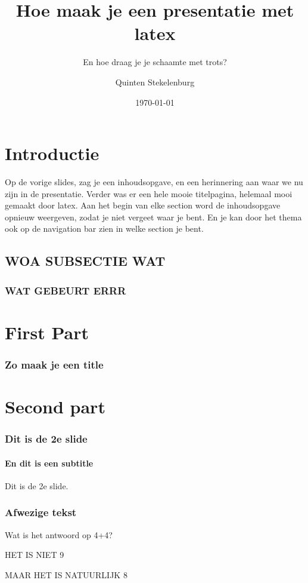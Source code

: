\documentclass{beamer}
\title[Something]{Hoe maak je een presentatie met latex}
\subtitle{En hoe draag je je schaamte met trots?}
\institute{Hogeschool Rotterdam}
\author{Quinten Stekelenburg}
\date{\today}
\begin{document}
\frame{\titlepage}


\frame
{
	\tableofcontents
}

\section[Introductie]{Introductie}


\frame
{
Op de vorige slides, zag je een inhoudsopgave, en een herinnering aan waar we nu zijn in de presentatie. Verder was er een hele mooie titelpagina, helemaal mooi gemaakt door latex. Aan het begin van elke section word de inhoudsopgave opnieuw weergeven, zodat je niet vergeet waar je bent. En je kan door het thema ook op de navigation bar zien in welke section je bent.
\transdissolve
}

\subsection[WOA SUBSECTIE WAT]{WOA SUBSECTIE WAT}

\frame
{
\blindtext
}

\subsubsection[WOA EEN SUBSUBSECTIE]{WAT GEBEURT ERRR}

\frame
{
\blindtext
}

\section[First Part]{First Part}

\frame
{
	\frametitle{Zo maak je een title}
	\blindtext
}

\section[Second part]{Second part}

\frame
{
\frametitle{Dit is de 2e slide}
\framesubtitle{En dit is een subtitle}
Dit is de 2e slide.
}

\frame
{
\frametitle{Afwezige tekst}
Wat is het antwoord op 4+4?
\pause

HET IS NIET 9
\pause

MAAR HET IS NATUURLIJK 8
}

\end{document}
